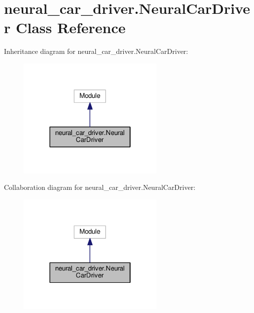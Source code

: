 \hypertarget{classneural__car__driver_1_1_neural_car_driver}{}\section{neural\+\_\+car\+\_\+driver.\+Neural\+Car\+Driver Class Reference}
\label{classneural__car__driver_1_1_neural_car_driver}


Inheritance diagram for neural\+\_\+car\+\_\+driver.\+Neural\+Car\+Driver\+:
\nopagebreak
\begin{figure}[H]
\begin{center}
\leavevmode
\includegraphics[width=202pt]{classneural__car__driver_1_1_neural_car_driver__inherit__graph}
\end{center}
\end{figure}


Collaboration diagram for neural\+\_\+car\+\_\+driver.\+Neural\+Car\+Driver\+:
\nopagebreak
\begin{figure}[H]
\begin{center}
\leavevmode
\includegraphics[width=202pt]{classneural__car__driver_1_1_neural_car_driver__coll__graph}
\end{center}
\end{figure}
